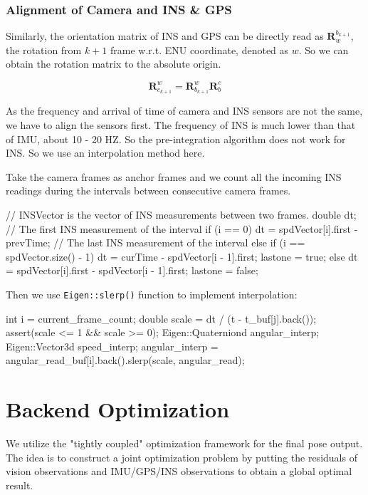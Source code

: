 \documentclass[12pt]{report}   %
\begin{document}
\subsection{Alignment of Camera and INS \& GPS}

Similarly, the orientation matrix of INS and GPS can be directly read as $\bm{R}_{w}^{b_{k+1}}$, the rotation from $k+1$ frame w.r.t. ENU coordinate, denoted as $w$. So we can obtain the rotation matrix to the absolute origin.

\begin{equation}
\bm{R}^{w}_{c_{k+1}} = \bm{R}^{w}_{b_{k+1}}\bm{R}_b^c
\end{equation}

As the frequency and arrival of time of camera and INS sensors are not the same, we have to align the sensors first. The frequency of INS is much lower than that of IMU, about 10 - 20 HZ. So the pre-integration algorithm does not work for INS. So we use an interpolation method here.

Take the camera frames as anchor frames and we count all the incoming INS readings during the intervals between consecutive camera frames.

\begin{cppcode}
// INSVector is the vector of INS measurements between two frames.
double dt;
// The first INS measurement of the interval
if (i == 0)
    dt = spdVector[i].first - prevTime;
// The last INS measurement of the interval
else if (i == spdVector.size() - 1) {
    dt = curTime - spdVector[i - 1].first;
    lastone = true;
} else {
    dt = spdVector[i].first - spdVector[i - 1].first;
    lastone = false;
}
\end{cppcode}

Then we use \verb|Eigen::slerp()| function to implement interpolation:

\begin{cppcode}
int i = current_frame_count;
double scale = dt / (t - t_buf[j].back());
assert(scale <= 1 && scale >= 0);
Eigen::Quaterniond angular_interp;
Eigen::Vector3d speed_interp;
angular_interp = angular_read_buf[i].back().slerp(scale, angular_read);
\end{cppcode}


\chapter{Backend Optimization}

We utilize the "tightly coupled" optimization framework for the final pose output. The idea is to construct a joint optimization problem by putting the residuals of vision observations and IMU/GPS/INS observations to obtain a global optimal result.
\end{document}
